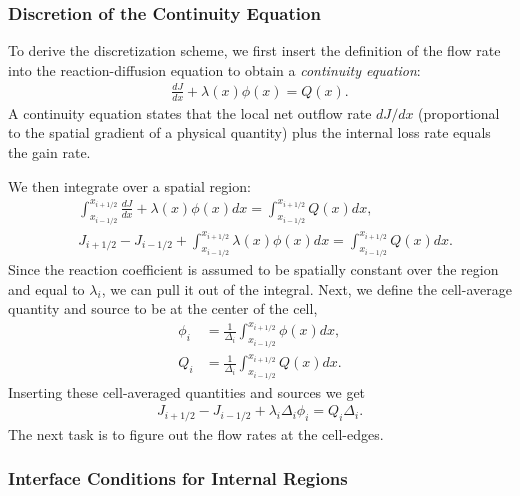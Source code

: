 \subsubsection{Discretion of the Continuity Equation}

To derive the discretization scheme, we first insert the definition of the flow rate into the reaction-diffusion equation to obtain a \emph{continuity equation}:
\begin{align}
  \frac{dJ}{dx} + \lambda(x) \phi(x) = Q(x) .
\end{align}
A continuity equation states that the local net outflow rate $dJ/dx$ (proportional to the spatial gradient of a physical quantity) plus the internal loss rate equals the gain rate. 

We then integrate over a spatial region:
\begin{align}
  &\int_{x_{i-1/2}}^{x_{i+1/2}} \frac{dJ}{dx} + \lambda(x) \phi(x) dx = \int_{x_{i-1/2}}^{x_{i+1/2}} Q(x) dx, \nonumber \\
  &J_{i+1/2} - J_{i-1/2} + \int_{x_{i-1/2}}^{x_{i+1/2}} \lambda(x) \phi(x) dx = \int_{x_{i-1/2}}^{x_{i+1/2}} Q(x) dx .
\end{align}
Since the reaction coefficient is assumed to be spatially constant over the region and equal to $\lambda_i$, we can pull it out of the integral. Next, we define the cell-average quantity and source to be at the center of the cell,
\begin{subequations}
\begin{align}
  \phi_i 	&= \frac{1}{\Delta_i} \int_{x_{i-1/2}}^{x_{i+1/2}} \phi(x) dx , \\
  Q_i 		&= \frac{1}{\Delta_i} \int_{x_{i-1/2}}^{x_{i+1/2}} Q(x) dx .
\end{align}
\end{subequations}
Inserting these cell-averaged quantities and sources we get
\begin{align}
  J_{i+1/2} - J_{i-1/2} + \lambda_i \Delta_i \phi_i = Q_i \Delta_i .
\end{align}
The next task is to figure out the flow rates at the cell-edges. 

\subsubsection{Interface Conditions for Internal Regions}

